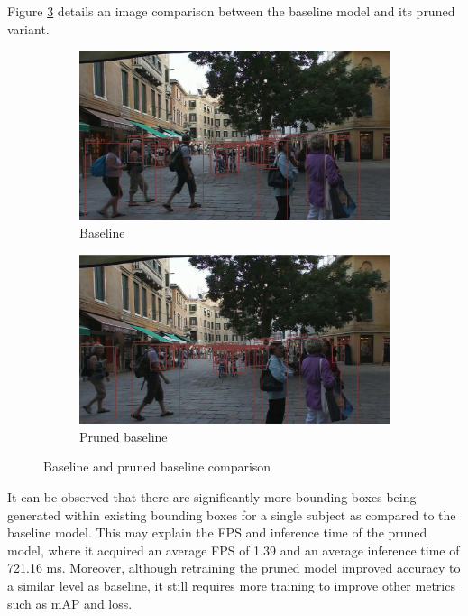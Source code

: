 Figure \ref{fig:basevsp} details an image comparison between the baseline model and its pruned variant.
\begin{figure}[!htbp]
\centering
\begin{subfigure}{.5\textwidth}
  \centering
  \includegraphics[width=0.9\linewidth]{images/base_MOT-02.png}
  \caption{Baseline}
  \label{fig:sub1}
\end{subfigure}%
\begin{subfigure}{.5\textwidth}
  \centering
  \includegraphics[width=0.9\linewidth]{images/baseP_MOT-02.png}
  \caption{Pruned baseline}
  \label{fig:sub2}
\end{subfigure}
\caption{Baseline and pruned baseline comparison}
\label{fig:basevsp}
\end{figure}

It can be observed that there are significantly more bounding boxes being generated within existing bounding boxes for a single subject as compared to the baseline model. This may explain the FPS and inference time of the pruned model, where it acquired an average FPS of 1.39 and an average inference time of 721.16 ms. Moreover, although retraining the pruned model improved accuracy to a similar level as baseline, it still requires more training to improve other metrics such as mAP and loss.

